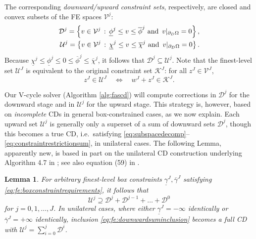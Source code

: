 \documentclass[letterpaper,final,12pt,reqno]{amsart}
\theoremstyle{cstyle}
\newtheorem{lemma}[theorem]{Lemma}
\theoremstyle{cstyle*}
\theoremstyle{dstyle}
\numberwithin{equation}{section}
\numberwithin{figure}{section}
\numberwithin{table}{section}
\numberwithin{theorem}{section}
\begin{document}
The corresponding \emph{downward/upward constraint sets}, respectively, are closed and convex subsets of the FE spaces $\mathcal{V}^j$:
\begin{align}
\mathcal{D}^j = \left\{v \in \mathcal{V}^j \,:\, \underline{\phi}^j \le v \le \overline{\phi}^j \text{ and } \, v|_{\partial_D\Omega} = 0\right\}, \label{eq:fe:constraintsets} \\
\mathcal{U}^j = \left\{v \in \mathcal{V}^j \,:\, \underline{\chi}^j \le v \le \overline{\chi}^j \text{ and } \, v|_{\partial_D\Omega} = 0\right\}. \notag
\end{align}
Because $\underline{\chi}^j \le \underline{\phi}^j \le 0 \le \overline{\phi}^j \le \overline{\chi}^j$, it follows that $\mathcal{D}^j \subseteq \mathcal{U}^j$.  Note that the finest-level set $\mathcal{U}^J$ is equivalent to the original constraint set $\mathcal{K}^J$: for all $z^J \in \mathcal{V}^J$,
\begin{equation}
z^J \in \mathcal{U}^J \quad \iff \quad w^J+z^J \in \mathcal{K}^J. \label{eq:fe:finestlevelequivalent}
\end{equation}

Our V-cycle solver (Algorithm \ref{alg:fascd}) will compute corrections in $\mathcal{D}^j$ for the downward stage and in $\mathcal{U}^j$ for the upward stage. This strategy is, however, based on \emph{incomplete} CDs in general box-constrained cases, as we now explain.  Each upward set $\mathcal{U}^j$ is generally only a superset of a sum of downward sets $\mathcal{D}^j$, though this becomes a true CD, i.e.~satisfying \eqref{eq:subspacedecomp}--\eqref{eq:constraintrestrictionsum}, in unilateral cases.  The following Lemma, apparently new, is based in part on the unilateral CD construction underlying Algorithm 4.7 in \cite{GraeserKornhuber2009}; see also equation (59) in \cite{Tai2003}.

\begin{lemma}  \label{lem:downwardadmissibility}  For arbitrary finest-level box constraints $\underline{\gamma}^J,\overline{\gamma}^J$ satisfying \eqref{eq:fe:boxconstraintrequirements}, it follows that
\begin{equation}
\mathcal{U}^j \supseteq \mathcal{D}^j + \mathcal{D}^{j-1} + \dots + \mathcal{D}^0 \label{eq:fe:downwardsuminclusion}
\end{equation}
for $j=0,1,\dots,J$.  In unilateral cases, where either $\underline{\gamma}^J=-\infty$ identically or $\overline{\gamma}^J=+\infty$ identically, inclusion \eqref{eq:fe:downwardsuminclusion} becomes a full CD with $\mathcal{U}^j=\sum_{i=0}^j \mathcal{D}^i$.
\end{lemma}
\end{document}

